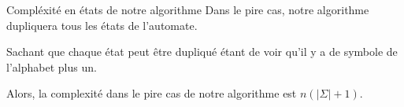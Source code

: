 \begin{frame}{\myframetitle}
  \begin{block}{Compléxité en états de notre algorithme}
    Dans le pire cas, notre algorithme dupliquera tous les états de
    l'automate. 

    \pause[]
    \vphantom{}

    Sachant que chaque état peut être dupliqué étant de voir qu'il y a de
    symbole de l'alphabet plus un. 

    \pause[]
    \vphantom{}

    Alors, la complexité dans le pire cas de notre algorithme est \(n(\lvert
    \Sigma \rvert + 1)\).
  \end{block}
\end{frame}
